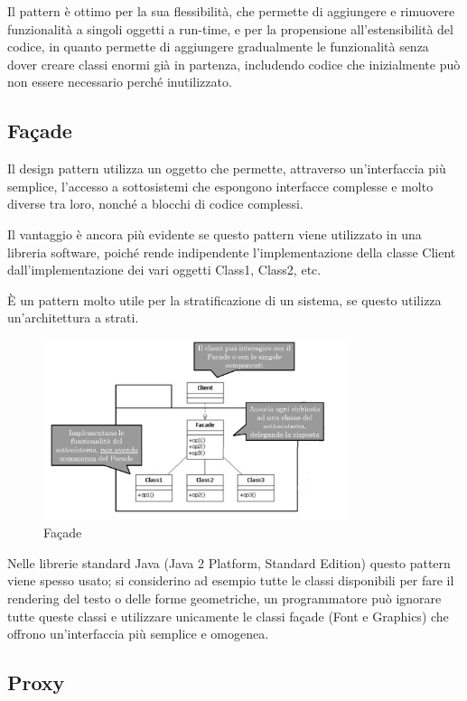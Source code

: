 Il pattern è ottimo per la sua flessibilità, che permette di aggiungere e rimuovere funzionalità a singoli oggetti a run-time, e per la propensione all'estensibilità del codice, in quanto permette di aggiungere gradualmente le funzionalità senza dover creare classi enormi già in partenza, includendo codice che inizialmente può non essere necessario perché inutilizzato.

\subsection{Façade}
Il design pattern utilizza un oggetto che permette, attraverso un'interfaccia più semplice, l'accesso a sottosistemi che espongono interfacce complesse e molto diverse tra loro, nonché a blocchi di codice complessi.

Il vantaggio è ancora più evidente se questo pattern viene utilizzato in una libreria software, poiché rende indipendente l'implementazione della classe Client dall'implementazione dei vari oggetti Class1, Class2, etc.

\`E un pattern molto utile per la stratificazione di un sistema, se questo utilizza un'architettura a strati.

\begin{figure}[H]
\includegraphics[width=0.8\textwidth]{res/img/DP/facade}
\caption{Façade}
\end{figure}

Nelle librerie standard Java (Java 2 Platform, Standard Edition) questo pattern viene spesso usato; si considerino ad esempio tutte le classi disponibili per fare il rendering del testo o delle forme geometriche, un programmatore può ignorare tutte queste classi e utilizzare unicamente le classi façade (Font e Graphics) che offrono un'interfaccia più semplice e omogenea.

\subsection{Proxy}

